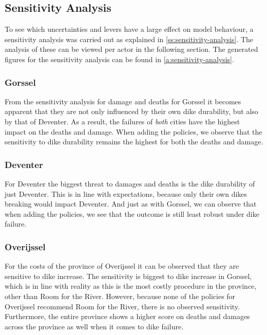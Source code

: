 \subsection{Sensitivity Analysis}

To see which uncertainties and levers have a large effect on model behaviour, a sensitivity analysis was carried out as explained in \autoref{ss:sensitivity-analysis}. The analysis of these can be viewed per actor in the following section. The generated figures for the sensitivity analysis can be found in \autoref{a:sensitivity-analysis}.


\subsubsection{Gorssel}

From the sensitivity analysis for damage and deaths for Gorssel it becomes apparent that they are not only influenced by their own dike durability, but also by that of Deventer. As a result, the failures of \textit{both} cities have the highest impact on the deaths and damage. When adding the policies, we observe that the sensitivity to dike durability remains the highest for both the deaths and damage. 

\subsubsection{Deventer}

For Deventer the biggest threat to damages and deaths is the dike durability of just Deventer. This is in line with expectations, because only their own dikes breaking would impact Deventer. And just as with Gorssel, we can observe that when adding the policies, we see that the outcome is still least robust under dike failure. 

\subsubsection{Overijssel}

For the costs of the province of Overijssel it can be observed that they are sensitive to dike increase. The sensitivity is biggest to dike increase in Gorssel, which is in line with reality as this is the most costly procedure in the province, other than Room for the River. However, because none of the policies for Overijssel recommend Room for the River, there is no observed sensitivity. Furthermore, the entire province shows a higher score on deaths and damages across the province as well when it comes to dike failure. 

